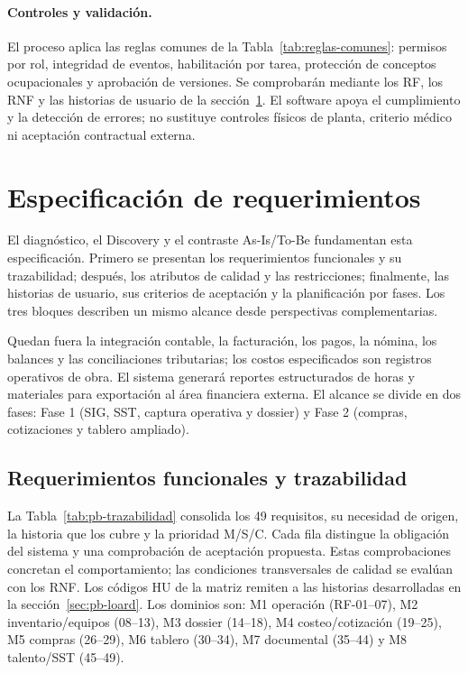 \documentclass[12pt,letterpaper]{article}
\begin{document}
\paragraph{Controles y validación.}
El proceso aplica las reglas comunes de la Tabla~\ref{tab:reglas-comunes}: permisos por rol, integridad de eventos, habilitación por tarea, protección de conceptos ocupacionales y aprobación de versiones. Se comprobarán mediante los RF, los RNF y las historias de usuario de la sección~\ref{sec:requerimientos}. El software apoya el cumplimiento y la detección de errores; no sustituye controles físicos de planta, criterio médico ni aceptación contractual externa.


\FloatBarrier
\section{Especificación de requerimientos}
\label{sec:requerimientos}
El diagnóstico, el Discovery y el contraste As-Is/To-Be fundamentan esta especificación. Primero se presentan los requerimientos funcionales y su trazabilidad; después, los atributos de calidad y las restricciones; finalmente, las historias de usuario, sus criterios de aceptación y la planificación por fases. Los tres bloques describen un mismo alcance desde perspectivas complementarias.

Quedan fuera la integración contable, la facturación, los pagos, la nómina, los balances y las conciliaciones tributarias; los costos especificados son registros operativos de obra. El sistema generará reportes estructurados de horas y materiales para exportación al área financiera externa. El alcance se divide en dos fases: Fase 1 (SIG, SST, captura operativa y dossier) y Fase 2 (compras, cotizaciones y tablero ampliado).

\subsection{Requerimientos funcionales y trazabilidad}
\label{sec:rf-loard}
La Tabla~\ref{tab:pb-trazabilidad} consolida los 49 requisitos, su necesidad de origen, la historia que los cubre y la prioridad M/S/C. Cada fila distingue la obligación del sistema y una comprobación de aceptación propuesta. Estas comprobaciones concretan el comportamiento; las condiciones transversales de calidad se evalúan con los RNF. Los códigos HU de la matriz remiten a las historias desarrolladas en la sección~\ref{sec:pb-loard}. Los dominios son: M1 operación (RF-01--07), M2 inventario/equipos (08--13), M3 dossier (14--18), M4 costeo/cotización (19--25), M5 compras (26--29), M6 tablero (30--34), M7 documental (35--44) y M8 talento/SST (45--49).
\end{document}
